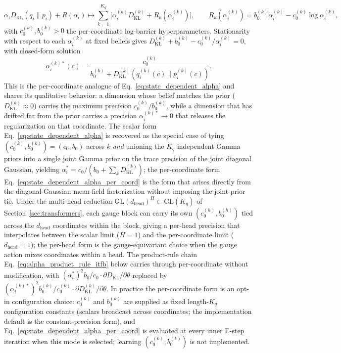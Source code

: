 \documentclass[11pt]{article}
\begin{document}
\begin{equation}
\alpha_i  D_{\mathrm{KL}}(q_i \| p_i) + R(\alpha_i)
\longmapsto
\sum_{k=1}^{K_q} \Big[\alpha_i^{(k)} D_{\mathrm{KL}}^{(k)} + R_k(\alpha_i^{(k)})\Big],
\qquad
R_k(\alpha_i^{(k)}) = b_0^{(k)} \alpha_i^{(k)} - c_0^{(k)} \log \alpha_i^{(k)},
\label{eq:adaptive_self_coupling_per_coord}
\end{equation}
with $c_0^{(k)}, b_0^{(k)} > 0$ the per-coordinate log-barrier hyperparameters. Stationarity with respect to each $\alpha_i^{(k)}$ at fixed beliefs gives $D_{\mathrm{KL}}^{(k)} + b_0^{(k)} - c_0^{(k)}/\alpha_i^{(k)} = 0$, with closed-form solution
\begin{equation}
\boxed{
\alpha_i^{(k)*}(c) = \frac{c_0^{(k)}}{b_0^{(k)} + D_{\mathrm{KL}}^{(k)}(q_i^{(k)}(c) \| p_i^{(k)}(c))}.
}
\label{eq:state_dependent_alpha_per_coord}
\end{equation}
This is the per-coordinate analogue of Eq.~\eqref{eq:state_dependent_alpha} and shares its qualitative behavior: a dimension whose belief matches the prior ($D_{\mathrm{KL}}^{(k)} \approx 0$) carries the maximum precision $c_0^{(k)}/b_0^{(k)}$, while a dimension that has drifted far from the prior carries a precision $\alpha_i^{(k)*} \to 0$ that releases the regularization on that coordinate. The scalar form Eq.~\eqref{eq:state_dependent_alpha} is recovered as the special case of tying $(c_0^{(k)}, b_0^{(k)}) = (c_0, b_0)$ across $k$ \emph{and} unioning the $K_q$ independent Gamma priors into a single joint Gamma prior on the trace precision of the joint diagonal Gaussian, yielding $\alpha_i^* = c_0 / (b_0 + \sum_k D_{\mathrm{KL}}^{(k)})$; the per-coordinate form Eq.~\eqref{eq:state_dependent_alpha_per_coord} is the form that arises directly from the diagonal-Gaussian mean-field factorization without imposing the joint-prior tie. Under the multi-head reduction $\mathrm{GL}(d_{\text{head}})^H \subset \mathrm{GL}(K_q)$ of Section~\ref{sec:transformers}, each gauge block can carry its own $(c_0^{(h)}, b_0^{(h)})$ tied across the $d_{\text{head}}$ coordinates within the block, giving a per-head precision that interpolates between the scalar limit ($H = 1$) and the per-coordinate limit ($d_{\text{head}} = 1$); the per-head form is the gauge-equivariant choice when the gauge action mixes coordinates within a head. The product-rule chain Eq.~\eqref{eq:alpha_product_rule_itfb} below carries through per-coordinate without modification, with $(\alpha_i^*)^2 b_0/c_0 \cdot \partial D_{\mathrm{KL}}/\partial\theta$ replaced by $(\alpha_i^{(k)*})^2 b_0^{(k)}/c_0^{(k)} \cdot \partial D_{\mathrm{KL}}^{(k)}/\partial\theta$. In practice the per-coordinate form is an opt-in configuration choice: $c_0^{(k)}$ and $b_0^{(k)}$ are supplied as fixed length-$K_q$ configuration constants (scalars broadcast across coordinates; the implementation default is the constant-precision form), and Eq.~\eqref{eq:state_dependent_alpha_per_coord} is evaluated at every inner E-step iteration when this mode is selected; learning $(c_0^{(k)}, b_0^{(k)})$ is not implemented.
\end{document}
